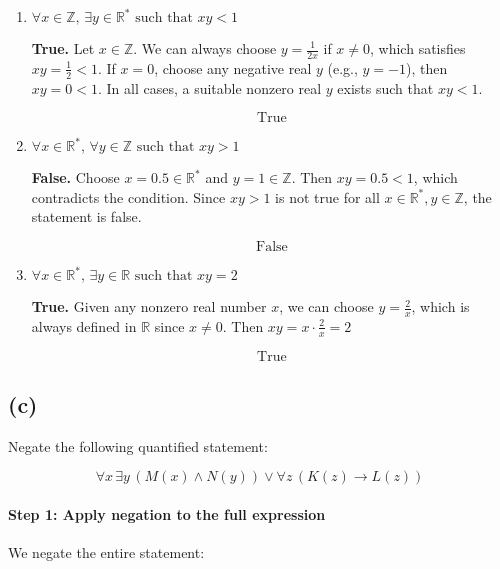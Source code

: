 \documentclass{article}
\begin{document}
\begin{enumerate}[label=\roman*.]

\item \( \forall x \in \mathbb{Z}, \, \exists y \in \mathbb{R}^* \text{ such that } xy < 1 \)

\textbf{True.}  
Let \( x \in \mathbb{Z} \). We can always choose \( y = \frac{1}{2x} \) if \( x \neq 0 \), which satisfies \( xy = \frac{1}{2} < 1 \).  
If \( x = 0 \), choose any negative real \( y \) (e.g., \( y = -1 \)), then \( xy = 0 < 1 \).  
In all cases, a suitable nonzero real \( y \) exists such that \( xy < 1 \).

\[
\boxed{\text{True}}
\]

\item \( \forall x \in \mathbb{R}^*, \, \forall y \in \mathbb{Z} \text{ such that } xy > 1 \)

\textbf{False.}  
Choose \( x = 0.5 \in \mathbb{R}^* \) and \( y = 1 \in \mathbb{Z} \). Then \( xy = 0.5 < 1 \), which contradicts the condition.  
Since \( xy > 1 \) is not true for all \( x \in \mathbb{R}^*, y \in \mathbb{Z} \), the statement is false.

\[
\boxed{\text{False}}
\]

\item \( \forall x \in \mathbb{R}^*, \, \exists y \in \mathbb{R} \text{ such that } xy = 2 \)

\textbf{True.}  
Given any nonzero real number \( x \), we can choose \( y = \frac{2}{x} \), which is always defined in \( \mathbb{R} \) since \( x \neq 0 \).  
Then \( xy = x \cdot \frac{2}{x} = 2 \)

\[
\boxed{\text{True}}
\]

\end{enumerate}

\subsection*{(c)}

Negate the following quantified statement:

\[
\forall x \, \exists y \, (M(x) \land N(y)) \lor \forall z \, (K(z) \to L(z))
\]

\paragraph{Step 1: Apply negation to the full expression}

We negate the entire statement:
\end{document}

